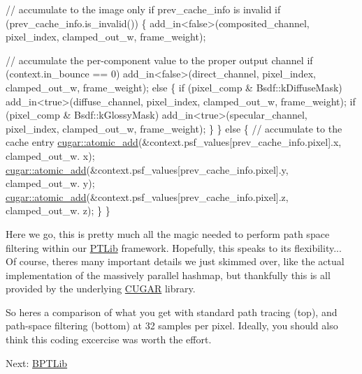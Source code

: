 \begin{DoxyCodeInclude}
        \textcolor{comment}{// accumulate to the image only if prev\_cache\_info is invalid}
        \textcolor{keywordflow}{if} (prev\_cache\_info.is\_invalid())
        \{
            add\_in<false>(composited\_channel, pixel\_index, clamped\_out\_w, frame\_weight);

            \textcolor{comment}{// accumulate the per-component value to the proper output channel}
            \textcolor{keywordflow}{if} (context.in\_bounce == 0)
                add\_in<false>(direct\_channel, pixel\_index, clamped\_out\_w, frame\_weight);
            \textcolor{keywordflow}{else}
            \{
                \textcolor{keywordflow}{if} (pixel\_comp & Bsdf::kDiffuseMask) add\_in<true>(diffuse\_channel,  pixel\_index, 
      clamped\_out\_w, frame\_weight);
                \textcolor{keywordflow}{if} (pixel\_comp & Bsdf::kGlossyMask)  add\_in<true>(specular\_channel, pixel\_index, 
      clamped\_out\_w, frame\_weight);
            \}
        \}
        \textcolor{keywordflow}{else} 
        \{
            \textcolor{comment}{// accumulate to the cache entry}
            \hyperlink{group___atomics_ga0c9d949be7ac5b6f27a232c7cd27a05c}{cugar::atomic\_add}(&context.psf\_values[prev\_cache\_info.pixel].x, clamped\_out\_w.
      x);
            \hyperlink{group___atomics_ga0c9d949be7ac5b6f27a232c7cd27a05c}{cugar::atomic\_add}(&context.psf\_values[prev\_cache\_info.pixel].y, clamped\_out\_w.
      y);
            \hyperlink{group___atomics_ga0c9d949be7ac5b6f27a232c7cd27a05c}{cugar::atomic\_add}(&context.psf\_values[prev\_cache\_info.pixel].z, clamped\_out\_w.
      z);
        \}
    \}
\end{DoxyCodeInclude}
 \begin{DoxyParagraph}{}
Here we go, this is pretty much all the magic needed to perform path space filtering within our \hyperlink{group___p_t_lib}{P\+T\+Lib} framework. Hopefully, this speaks to its flexibility... ~\newline
 Of course, there\textquotesingle{}s many important details we just skimmed over, like the actual implementation of the massively parallel hashmap, but thankfully this is all provided by the underlying \hyperlink{cugar_page}{C\+U\+G\+AR} library.
\end{DoxyParagraph}
\begin{DoxyParagraph}{}
So here\textquotesingle{}s a comparison of what you get with standard path tracing (top), and path-\/space filtering (bottom) at 32 samples per pixel. Ideally, you should also think this coding excercise was worth the effort.  ~\newline
  ~\newline

\end{DoxyParagraph}
Next\+: \hyperlink{_b_p_t_lib_page}{B\+P\+T\+Lib} 